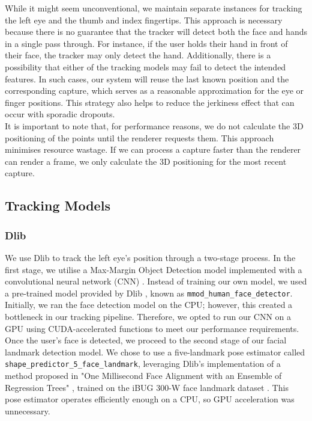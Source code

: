 While it might seem unconventional, we maintain separate instances for tracking the left eye and the thumb and index fingertips. This approach is necessary because there is no guarantee that the tracker will detect both the face and hands in a single pass through. For instance, if the user holds their hand in front of their face, the tracker may only detect the hand. Additionally, there is a possibility that either of the tracking models may fail to detect the intended features. In such cases, our system will reuse the last known position and the corresponding capture, which serves as a reasonable approximation for the eye or finger positions. This strategy also helps to reduce the jerkiness effect that can occur with sporadic dropouts. \\

It is important to note that, for performance reasons, we do not calculate the 3D positioning of the points until the renderer requests them. This approach minimises resource wastage. If we can process a capture faster than the renderer can render a frame, we only calculate the 3D positioning for the most recent capture.

\subsection{Tracking Models}

\subsubsection{Dlib}
We use Dlib to track the left eye's position through a two-stage process. In the first stage, we utilise a Max-Margin Object Detection model \cite{king2015maxmargin, noauthor_dlib_nodate} implemented with a convolutional neural network (CNN) \cite{DBLP:journals/corr/Schmidhuber14}. Instead of training our own model, we used a pre-trained model provided by Dlib \cite{noauthor_index_nodate}, known as \texttt{mmod\_human\_face\_detector}. Initially, we ran the face detection model on the CPU; however, this created a bottleneck in our tracking pipeline. Therefore, we opted to run our CNN on a GPU using CUDA-accelerated functions to meet our performance requirements. \\

Once the user's face is detected, we proceed to the second stage of our facial landmark detection model. We chose to use a five-landmark pose estimator called \texttt{shape\_predictor\_5\_face\_landmark}, leveraging Dlib's implementation of a method proposed in "One Millisecond Face Alignment with an Ensemble of Regression Trees" \cite{6909637}, trained on the iBUG 300-W face landmark dataset \cite{6755925}. This pose estimator operates efficiently enough on a CPU, so GPU acceleration was unnecessary. \\

